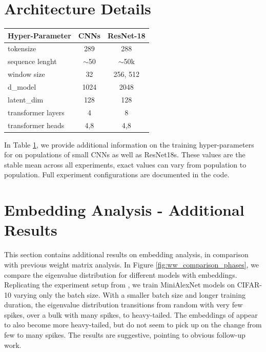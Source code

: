 \vspace{32pt}
\section{\ourmethod Architecture Details}

\begin{table}
\vspace{-16mm}
\label{tab:architecture_details}
\small
\setlength{\tabcolsep}{12pt}
\begin{tabularx}{1.0\linewidth}{lcc}
\toprule
\multicolumn{1}{c}{Hyper-Parameter} & CNNs     & ResNet-18 \\ \midrule
tokensize                           & 289      & 288       \\
sequence lenght                     & $\sim$50 & $\sim$50k \\
window size                         & 32       & 256, 512  \\
d\_model                            & 1024     & 2048      \\
latent\_dim                         & 128      & 128       \\
transformer layers                  & 4        & 8         \\
transformer heads                   & 4,8      & 4,8       \\
\bottomrule
\end{tabularx}
\vspace{-8mm}
\end{table} 
In Table \ref{tab:architecture_details}, we provide additional information on the training hyper-parameters for \ourmethod on populations of small CNNs as well as ResNet18s. These values are the stable mean across all experiments, exact values can vary from population to population. Full experiment configurations are documented in the code.

\vspace{16pt}

\section{\ourmethod Embedding Analysis - Additional Results}
This section contains additional results on \ourmethod embedding analysis, in comparison with previous weight matrix analysis. 
In Figure \ref{fig:ww_comparison_phases}, we compare the eigenvalue distribution for different models with \ourmethod embeddings. Replicating the experiment setup from \citep{martinTraditionalHeavyTailedSelf2019,martinImplicitSelfregularizationDeep2021}, we train MiniAlexNet models on CIFAR-10 varying only the batch size. With a smaller batch size and longer training duration, the eigenvalue distribution transitions from random with very few spikes, over a bulk with many spikes, to heavy-tailed. The embeddings of \ourmethod appear to also become more heavy-tailed, but do not seem to pick up on the change from few to many spikes. 
The results are suggestive, pointing to obvious follow-up work.

